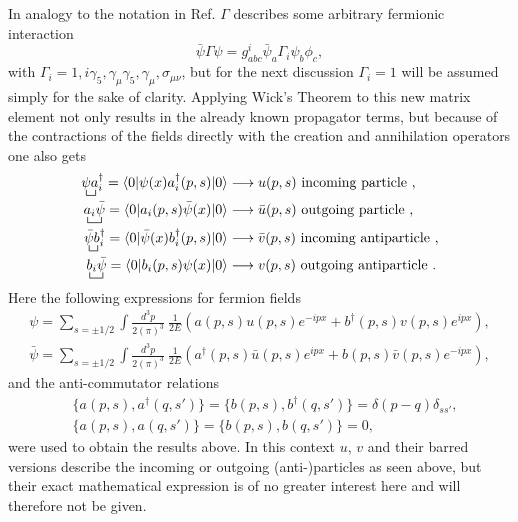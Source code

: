 In analogy to the notation in Ref.\cite{Denner:1992vza} $\Gamma$ describes some arbitrary fermionic interaction
\begin{equation*}
	\bar{\psi}\Gamma\psi=g^i_{abc}\bar{\psi}_a\Gamma_i\psi_b\phi_c,
\end{equation*}
with $\Gamma_i=1,i\gamma_5,\gamma_\mu\gamma_5,\gamma_\mu,\sigma_{\mu\nu}$, but for the next discussion $\Gamma_i=1$ will be assumed simply for the sake of clarity. \newline\indent
Applying Wick's Theorem to this new matrix element not only results in the already known propagator terms, but because of the contractions of the fields directly with the creation and annihilation operators one also gets
\begin{align*}
		\bcontraction{}{\psi}{}{a}\psi a_i^\dagger=\braket{0|\psi(x) a_i^\dagger(p,s)|0}&\longrightarrow u(p,s) \text{ incoming particle },\\
		\bcontraction{}{a}{{}_i}{\bar{\psi}}a_i\bar{\psi}=\braket{0|a_i(p,s)\bar{\psi}(x)|0}&\longrightarrow \bar{u}(p,s) \text{ outgoing particle },\\
		\bcontraction{}{\bar{\psi}}{}{b}\bar{\psi} b_i^\dagger=\braket{0|\bar{\psi}(x) b_i^\dagger(p,s)|0}&\longrightarrow \bar{v}(p,s)\text{ incoming antiparticle },\\
		\bcontraction{}{b}{{}_i}{\psi}b_i\bar{\psi}=\braket{0|b_i(p,s)\psi(x)|0}&\longrightarrow v(p,s)\text{ outgoing antiparticle }.
\end{align*}
Here the following expressions for fermion fields
\begin{align*}
\psi=\sum_{s=\pm1/2}\int \frac{d^3p}{2(\pi)^3}\:\frac{1}{2E}\left(a(p,s)u(p,s)e^{-ipx}+b^\dagger(p,s)v(p,s)e^{ipx}\right),\\
\bar{\psi}=\sum_{s=\pm1/2}\int \frac{d^3p}{2(\pi)^3}\:\frac{1}{2E}\left(a^\dagger(p,s)\bar{u}(p,s)e^{ipx}+b(p,s)\bar{v}(p,s)e^{-ipx}\right),
\end{align*}
and the anti-commutator relations
\begin{align*}
		&\{a(p,s),a^\dagger(q,s')\}=\{b(p,s),b^\dagger(q,s')\}=\delta(p-q)\delta_{ss'},\\
		&\{a(p,s),a(q,s')\}=\{b(p,s),b(q,s')\}=0,
\end{align*}
were used to obtain the results above.
In this context $u$, $v$ and their barred versions describe the incoming or outgoing (anti-)particles as seen above, but their exact mathematical expression is of no greater interest here and will therefore not be given. \newline\indent
